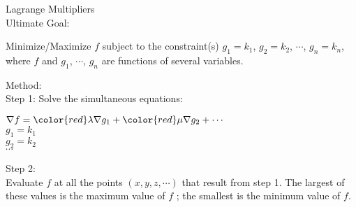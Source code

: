 \documentclass[10pt]{beamer}
\begin{document}
\begin{frame}[allowframebreaks]{Lagrange Multipliers}~\\
{\color{blue}Ultimate Goal}:
\begin{center}
	Minimize/Maximize $f$ subject to the constraint(s) $g_1= k_1$, $g_2 = k_2$, $\cdots$, $g_n = k_n$, \\where $f$ and $g_1$, $\cdots$, $g_n$ are functions of several variables.
\end{center}

{\color{blue}Method}:\\Step 1: Solve the simultaneous equations:
\begin{center}
	$\nabla f = {\color{red}\lambda} \nabla g_1 + {\color{red}\mu} \nabla g_2 + \cdots$\\$g_1 = k_1$\\$g_2 = k_2$\\$\cdots$
\end{center}
\noindent
Step 2: 
\\Evaluate $f$ at all the points $(x,y,z,\cdots)$ that result from step 1. The largest of
these values is the maximum value of $f$ ; the smallest is the minimum value
of $f$.
	
\end{frame}
\end{document}
